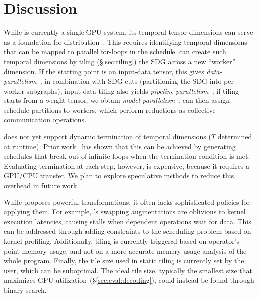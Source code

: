 
\section{Discussion}
\label{sec:discussion}


 While \sys{} is currently a single-GPU system, its temporal tensor dimensions can serve as a foundation for distribution~\cite{silvestre2025rlft}. This requires identifying temporal dimensions that can be mapped to parallel for-loops in the schedule. 
\sys{} can create such temporal dimensions by tiling (\S\ref{sec:tiling}) the SDG across a new ``worker'' dimension. If the starting point is an input-data tensor, this gives \emph{data-parallelism}~\cite{krizhevsky2017imagenet}; in combination with SDG cuts (partitioning the SDG into per-worker subgraphs), input-data tiling also yields \emph{pipeline parallelism}~\cite{huang2019gpipe}; if tiling starts from a weight tensor, we obtain \emph{model-parallelism}~\cite{shoeybi2019megatron}. \sys{} can then assign schedule partitions to workers, which perform reductions as collective communication operations. 

 \sys{} does not yet support dynamic termination of temporal dimensions (\eg $T$ determined at runtime). Prior work~\cite{benabderrahmane2010polyhedral} has shown that this can be achieved by generating schedules that break out of infinite loops when the termination condition is met. Evaluating termination at each step, however, is expensive, because it requires a GPU/CPU transfer. We plan to explore speculative methods to reduce this overhead in future work.


 While \sys{} proposes powerful transformations, it often lacks sophisticated policies for applying them. For example, \sys{}'s swapping augmentations are oblivious to kernel execution latencies, causing stalls when dependent operations wait for data. This can be addressed through adding constraints to the scheduling problem based on kernel profiling.
Additionally, tiling is currently triggered based on operator's point memory usage, and not on a more accurate memory usage analysis of the whole program. Finally, the tile size used in static tiling is currently set by the user, which can be suboptimal. The ideal tile size, typically the smallest size that maximizes GPU utilization~(\S\ref{sec:eval:decoding}), could instead be found through binary search.



